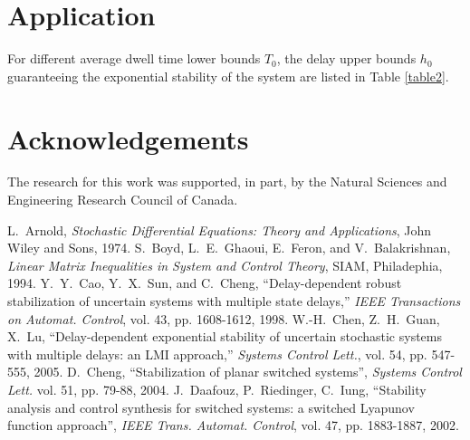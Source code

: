 \documentclass[a4paper,twocolumn,twoside,10pt]{article}
\theoremstyle{definition}
\begin{document}
\section{Application}\label{sec4}


For different average
dwell time lower bounds $T_0$, the delay upper bounds $h_0$
guaranteeing the exponential stability of the system are listed in
Table \ref{table2}.


\section*{Acknowledgements}
The research for this work was supported, in part, by the Natural
Sciences and Engineering Research Council of Canada.

\footnotesize

\begin{thebibliography}{1}
L.~Arnold, \emph{Stochastic Differential Equations: Theory
and Applications}, John Wiley and Sons, 1974.
S.~Boyd, L.~E.~Ghaoui, E.~Feron, and V.~Balakrishnan,
\emph{Linear Matrix Inequalities in System and Control Theory},
SIAM, Philadephia, 1994.
Y.~Y.~Cao, Y.~X.~Sun, and C.~Cheng, ``Delay-dependent robust stabilization of uncertain systems with multiple state
delays,'' \emph{IEEE Transactions on Automat. Control}, vol. 43, pp.
1608-1612, 1998.
W.-H.~Chen, Z.~H.~Guan, X.~Lu, ``Delay-dependent exponential stability of uncertain stochastic
systems with multiple delays: an LMI approach,'' \emph{Systems
Control Lett.}, vol. 54, pp. 547-555, 2005.
D.~Cheng, ``Stabilization of planar switched systems'',
\emph{Systems Control Lett.} vol. 51, pp. 79-88, 2004.
J.~Daafouz, P.~Riedinger, C.~Iung, ``Stability analysis and control
synthesis for switched systems: a switched Lyapunov function
approach'', \emph{IEEE Trans. Automat. Control}, vol. 47, pp.
1883-1887, 2002.
\end{thebibliography}
\end{document}
